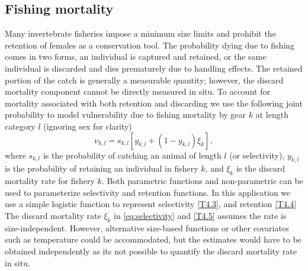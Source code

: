 \documentclass[12pt,letterpaper]{article}
\begin{document}

    \subsection*{Fishing mortality} %
    \label{sub:fishing_mortality}

    Many invertebrate fisheries  impose a minimum size limits and prohibit the retention of females as a conservation tool.  The probability dying due to fishing comes in two forms, an individual is captured and retained, or the same individual is discarded and dies prematurely due to handling effects.  The retained portion of the catch is generally a measurable quantity; however, the discard mortality component cannot be directly measured in situ.  To account for mortality associated with both retention and discarding we use the following joint probability to model vulnerability due to fishing mortality by gear $k$ at length category $l$ (ignoring sex for clarity)
    \begin{equation}\label{eq:selectivity}
      \nu_{k,l}  = s_{k,l} [y_{k,l} + (1-y_{k,l})\xi_{k}],
    \end{equation}
    where $s_{k,l}$ is the probability of catching an animal of length $l$ (or selectivity), $y_{k,l}$ is the probability of retaining an individual in fishery $k$, and $\xi_{k}$ is the discard mortality rate for fishery $k$.  Both parametric functions and non-parametric can be used to parameterize selectivity and retention functions.  In this application we use a simple logistic function to represent selectivity \eqref{T4.3}, and retention \eqref{T4.4} The discard mortality rate $\xi_k$ in \eqref{eq:selectivity} and \eqref{T4.5} assumes the rate is size-independent.  However, alternative size-based functions or other covariates such as temperature could be accommodated, but the estimates would have to be obtained independently as its not possible to quantify the discard mortality rate in situ.
\end{document}
